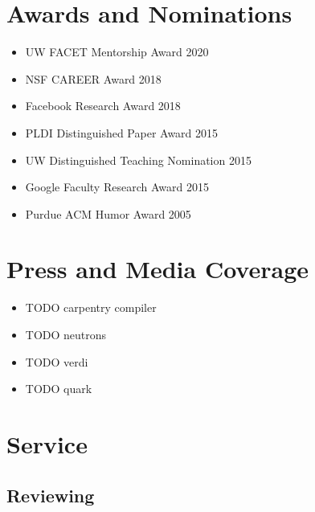 \documentclass[10pt]{article}
\begin{document}
\section*{Awards and Nominations}

\begin{itemize}
  \item UW FACET Mentorship Award 2020
  \item NSF CAREER Award 2018
  \item Facebook Research Award 2018
  \item PLDI Distinguished Paper Award 2015
  \item UW Distinguished Teaching Nomination 2015
  \item Google Faculty Research Award 2015
  \item Purdue ACM Humor Award 2005
\end{itemize}

\section*{Press and Media Coverage}

\begin{itemize}
  \item TODO carpentry compiler
  \item TODO neutrons
  \item TODO verdi
  \item TODO quark
\end{itemize}


\section*{Service}

\subsection*{Reviewing}
\end{document}

